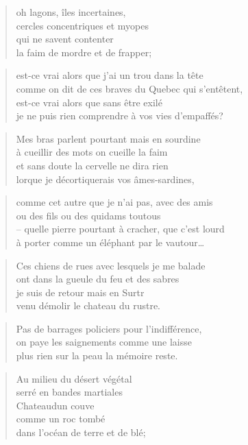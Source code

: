  \begin{verse}
    oh lagons, îles incertaines,\\
    cercles concentriques et myopes\\
    qui ne savent contenter\\
    la faim de mordre et de frapper;
  \end{verse}
  \begin{verse}
    est-ce vrai alors que j’ai un trou dans la tête\\
    comme on dit de ces braves du Quebec qui s’entêtent,\\
    est-ce vrai alors que sans être exilé\\
    je ne puis rien comprendre à vos vies d’empaffés?
  \end{verse}
  \begin{verse}
    Mes bras parlent pourtant mais en sourdine\\
    à cueillir des mots on cueille la faim\\
    et sans doute la cervelle ne dira rien\\
    lorque je décortiquerais vos âmes-sardines,
  \end{verse}
  \begin{verse}
    comme cet autre que je n’ai pas, avec des amis\\
    ou des fils ou des quidams toutous\\
    -- quelle pierre pourtant à cracher, que c’est lourd\\
    à porter comme un éléphant par le vautour…
  \end{verse}
  \begin{verse}
    Ces chiens de rues avec lesquels je me balade\\
    ont dans la gueule du feu et des sabres\\
    je suis de retour mais en Surtr\\
    venu démolir le chateau du rustre.
  \end{verse}
  \begin{verse}
    Pas de barrages policiers pour l’indifférence,\\
    on paye les saignements comme une laisse\\
    plus rien sur la peau la mémoire reste.
  \end{verse}
  \begin{verse}
    Au milieu du désert végétal\\
    serré en bandes martiales\\
    Chateaudun couve\\
    comme un roc tombé\\
    dans l’océan de terre et de blé;
  \end{verse}
